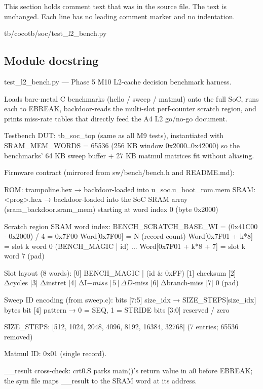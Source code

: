 This section holds comment text that was in the source file. The text is unchanged. Each line has no leading comment marker and no indentation.

\begin{relocated}{tb/cocotb/soc/test_l2_bench.py}

\subsection*{Module docstring}

\begin{textblock}
test_l2_bench.py — Phase 5 M10 L2-cache decision benchmark harness.

Loads bare-metal C benchmarks (hello / sweep / matmul) onto the full SoC,
runs each to EBREAK, backdoor-reads the multi-slot perf-counter scratch
region, and prints miss-rate tables that directly feed the A4 L2 go/no-go
document.

Testbench DUT: tb_soc_top (same as all M9 tests), instantiated with
SRAM_MEM_WORDS = 65536  (256 KB window 0x2000..0x42000)
so the benchmarks' 64 KB sweep buffer + 27 KB matmul matrices fit without
aliasing.

Firmware contract (mirrored from sw/bench/bench.h and README.md):

ROM: trampoline.hex  → backdoor-loaded into u_soc.u_boot_rom.mem
SRAM: <prog>.hex     → backdoor-loaded into the SoC SRAM array
(sram_backdoor.sram_mem) starting at word index 0 (byte 0x2000)

Scratch region SRAM word index:
BENCH_SCRATCH_BASE_WI = (0x41C00 - 0x2000) / 4 = 0x7F00
Word[0x7F00]       = N  (record count)
Word[0x7F01 + k*8] = slot k word 0  (BENCH_MAGIC | id)
...
Word[0x7F01 + k*8 + 7] = slot k word 7  (pad)

Slot layout (8 words):
[0] BENCH_MAGIC | (id & 0xFF)
[1] checksum
[2] Δcycles
[3] Δinstret
[4] ΔI$-miss
[5] ΔD$-miss
[6] Δbranch-miss
[7] 0 (pad)

Sweep ID encoding (from sweep.c):
bits [7:5]  size_idx  → SIZE_STEPS[size_idx] bytes
bit  [4]    pattern   → 0 = SEQ, 1 = STRIDE
bits [3:0]  reserved / zero

SIZE_STEPS: [512, 1024, 2048, 4096, 8192, 16384, 32768]  (7 entries; 65536 removed)

Matmul ID: 0x01 (single record).

__result cross-check: crt0.S parks main()'s return value in a0 before
EBREAK; the sym file maps __result to the SRAM word at its address.
\end{textblock}

\end{relocated}

